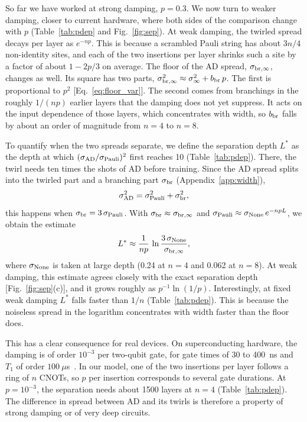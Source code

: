 \documentclass[
 aps,pra,
 twocolumn,
 superscriptaddress,
 longbibliography,
 nofootinbib
]{revtex4-2}
\newcommand{\AD}{\mathrm{AD}}
\begin{document}
So far we have worked at strong damping, $p=0.3$. We now turn to weaker
damping, closer to current hardware, where both sides of the comparison change
with $p$ (Table~\ref{tab:pdep} and Fig.~\ref{fig:sep}). At weak damping,
the twirled spread decays per layer as $e^{-np}$. This is because a scrambled
Pauli string has about $3n/4$ non-identity sites, and each of the two
insertions per layer shrinks such a site by a factor of about $1-2p/3$ on
average. The floor of the AD spread, $\sigma_{\rm br,\infty}$, changes as well.
Its square has two parts,
$\sigma_{\rm br,\infty}^2\approx\sigma_\infty^2+b_{\rm br}\,p$. The first is
proportional to $p^2$ [Eq.~\eqref{eq:floor_var}]. The second comes from
branchings in the roughly $1/(np)$ earlier layers that the damping does not yet
suppress. It acts on the input dependence of those layers, which concentrates
with width, so $b_{\rm br}$ falls by about an order of magnitude from $n=4$ to
$n=8$.

To quantify when the two spreads separate, we define the separation depth
$L^*$ as the depth at which $(\sigma_{\AD}/\sigma_{\rm Pauli})^2$ first
reaches 10 (Table~\ref{tab:pdep}). There, the twirl needs ten times the shots
of AD before training. Since the AD spread splits into the twirled part
and a branching part $\sigma_{\rm br}$ (Appendix~\ref{app:width}),
\begin{equation}
\sigma_{\AD}^2=\sigma_{\rm Pauli}^2+\sigma_{\rm br}^2 ,
\label{eq:split}
\end{equation}
this happens when $\sigma_{\rm br}=3\,\sigma_{\rm Pauli}$. With
$\sigma_{\rm br}\approx\sigma_{\rm br,\infty}$ and
$\sigma_{\rm Pauli}\approx\sigma_{\rm None}\,e^{-npL}$, we obtain the estimate
\begin{equation}
L^*\approx\frac{1}{np}\,\ln\frac{3\,\sigma_{\rm None}}{\sigma_{\rm br,\infty}},
\label{eq:Lstar}
\end{equation}
where $\sigma_{\rm None}$ is taken at large depth (0.24 at $n=4$ and 0.062 at
$n=8$). At weak damping, this estimate agrees closely with the exact separation
depth [Fig.~\ref{fig:sep}(c)], and it grows
roughly as $p^{-1}\ln(1/p)$. Interestingly, at fixed weak damping $L^*$ falls
faster than $1/n$ (Table~\ref{tab:pdep}). This is because the noiseless spread
in the logarithm concentrates with width faster than the floor does.

This has a clear consequence for real devices. On superconducting hardware,
the damping
is of order $10^{-3}$ per two-qubit gate, for gate times of 30 to 400~ns and
$T_1$ of order $100~\mu$s~\cite{krantz2019quantum}. In our model, one of the
two insertions per layer follows a ring of $n$ CNOTs, so $p$ per insertion
corresponds to several gate durations. At $p=10^{-3}$, the separation needs
about 1500 layers at $n=4$ (Table~\ref{tab:pdep}). The difference in
spread between AD and its twirls is therefore a property of strong damping or
of very deep circuits.
\end{document}
